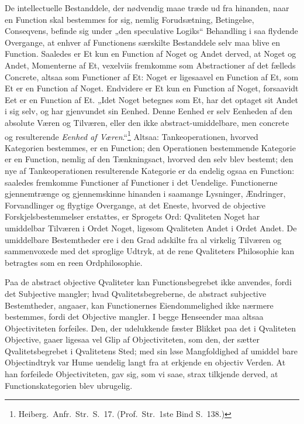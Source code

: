 \documentclass[12pt]{book}
\newcommand{\opage}[1]{\marginnote{\footnotesize\textit{[#1]}}}
\begin{document}
De intellectuelle Bestanddele, der nødvendig maae træde ud fra hinanden, naar en Function skal
bestemmes for sig, nemlig Forudsætning, Betingelse, Conseqvens, befinde sig under „den speculative
Logiks“ Behandling i saa flydende Overgange, at enhver af Functionens særskilte Bestanddele selv maa
blive en Function. Saaledes er Et kun en Function af Noget og Andet derved, at Noget og Andet,
Momenterne
\opage{292} af Et, vexelviis fremkomme som Abstractioner af det fælleds Concrete, altsaa som Functioner af Et:
Noget er ligesaavel en Function af Et, som Et er en Function af Noget. Endvidere er Et kun en Function
af Noget, forsaavidt Eet er en Function af Et. „Idet Noget betegnes som Et, har det optaget sit Andet i
sig selv, og har gjenvundet sin Eenhed. Denne Eenhed er selv Eenheden af den absolute Væren og
Tilværen, eller den ikke abstract-umiddelbare, men concrete og resulterende \emph{Eenhed af
Væren}.“\footnote{Heiberg.\ Anfr.\ Str.\ S.~17. (Prof.\ Str.\ 1ste Bind S.~138.)} Altsaa:
Tankeoperationen, hvorved Kategorien bestemmes, er en Function; den Operationen bestemmende Kategorie er
en Function, nemlig af den Tænkningsact, hvorved den selv blev bestemt; den nye af Tankeoperationen
resulterende Kategorie er da endelig ogsaa en Function: saaledes fremkomme Functioner af Functioner i
det Uendelige. Functionerne gjennemtrænge og gjennemskinne hinanden i saamange Lysninger, Ændringer,
Forvandlinger og flygtige Overgange, at det Eneste, hvorved de objective Forskjelsbestemmelser
erstattes, er Sprogets Ord: Qvaliteten Noget har umiddelbar Tilværen i Ordet Noget, ligesom Qvaliteten
Andet i Ordet Andet. De umiddelbare Bestemtheder ere i den Grad adskilte fra al virkelig Tilværen og
sammenvoxede med det sproglige Udtryk, at de rene Qvaliteters Philosophie kan betragtes som en reen
Ordphilosophie.

Paa de abstract objective Qvaliteter kan Functionsbegrebet ikke anvendes, fordi det Subjective mangler;
hvad Qvalitetsbegreberne, de abstract subjective Bestemtheder, angaaer, kan Functionernes
Eiendommelighed ikke nærmere bestemmes, fordi det Objective mangler. I begge Henseender maa altsaa
Objectiviteten forfeiles. Den, der udelukkende fæster Blikket paa det i Qvaliteten Objective, gaaer
ligesaa vel Glip af Objectiviteten, som den, der sætter Qvalitetsbegrebet i Qvalitetens Sted; med sin
løse Mangfoldighed af umiddel%
\opage{293} bare Objectindtryk var Hume uendelig langt fra at erkjende en objectiv Verden. At han forfeilede
Objectiviteten, gav sig, som vi saae, strax tilkjende derved, at Functionskategorien blev ubrugelig.
\end{document}
